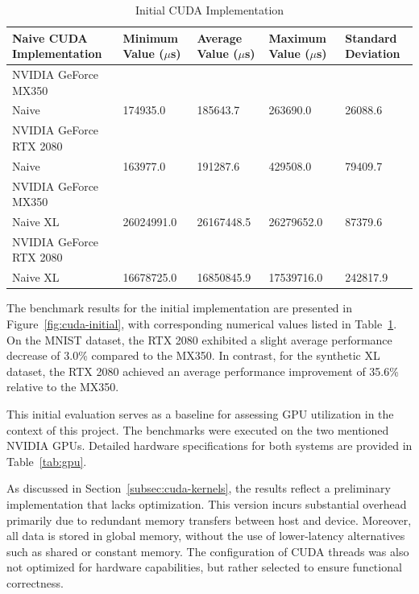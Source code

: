 \documentclass[modern,longauthor]{aastex7}
\begin{document}
\begin{table}[htb!]
\centering
\caption{Initial CUDA Implementation\label{tab:initial_cuda}}
\begin{tabular}{p{5cm} p{2cm} p{2cm} p{2cm} p{2cm}}
\hline
Naive CUDA Implementation & Minimum Value ($\mu$s) & Average Value ($\mu$s) & Maximum Value ($\mu$s) & Standard Deviation \\
\hline
NVIDIA GeForce MX350 \\
\hspace{0.5cm}Naive & 174935.0 & 185643.7 & 263690.0 & 26088.6 \\
NVIDIA GeForce RTX 2080 \\
\hspace{0.5cm}Naive & 163977.0 & 191287.6 & 429508.0 & 79409.7 \\
\hline
NVIDIA GeForce MX350 \\
\hspace{0.5cm}Naive XL & 26024991.0 & 26167448.5 & 26279652.0 & 87379.6 \\
NVIDIA GeForce RTX 2080 \\
\hspace{0.5cm}Naive XL & 16678725.0 & 16850845.9 & 17539716.0 & 242817.9 \\
\hline
\end{tabular}
\end{table}
\FloatBarrier

The benchmark results for the initial implementation are presented in Figure~\ref{fig:cuda-initial}, with corresponding numerical values listed in Table~\ref{tab:initial_cuda}. On the MNIST dataset, the RTX 2080 exhibited a slight average performance decrease of 3.0\% compared to the MX350. In contrast, for the synthetic XL dataset, the RTX 2080 achieved an average performance improvement of 35.6\% relative to the MX350.

This initial evaluation serves as a baseline for assessing GPU utilization in the context of this project. The benchmarks were executed on the two mentioned NVIDIA GPUs. Detailed hardware specifications for both systems are provided in Table~\ref{tab:gpu}.

As discussed in Section~\ref{subsec:cuda-kernels}, the results reflect a preliminary implementation that lacks optimization. This version incurs substantial overhead primarily due to redundant memory transfers between host and device. Moreover, all data is stored in global memory, without the use of lower-latency alternatives such as shared or constant memory. The configuration of CUDA threads was also not optimized for hardware capabilities, but rather selected to ensure functional correctness.
\end{document}
